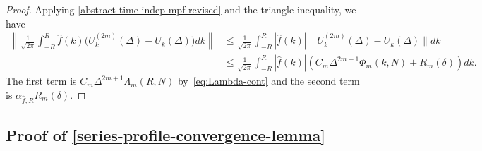 \documentclass[10pt,reqno]{article}
\numberwithin{equation}{section}
\theoremstyle{plain}
\theoremstyle{definition}
\begin{document}
\begin{proof}
Applying \cref{abstract-time-indep-mpf-revised} and the triangle inequality, we have
\begin{align}
\left\|\frac{1}{\sqrt{2 \pi}}  \int_{-R}^{R} \hat f(k)\big(U^{(2m)}_k(\Delta)-U_k(\Delta)\big)dk\right\|
&\le \frac{1}{\sqrt{2 \pi}} \int_{-R}^{R} |\hat f(k)| \|U^{(2m)}_k(\Delta)-U_k(\Delta) \| dk   \\
&\le \frac{1}{\sqrt{2 \pi}} \int_{-R}^{R} |\hat f(k)| (C_m\Delta^{2m+1}\Phi_m(k,N)+R_m(\delta) ) dk.
\end{align}
The first term is $ C_m \Delta^{2m+1}\Lambda_m(R,N)$ by~\cref{eq:Lambda-cont} and the second term is $\alpha_{\hat f, R} R_m(\delta)$.
\end{proof}

\subsection{Proof of \cref{series-profile-convergence-lemma}}\label{proof-of-series-profile-convergence-lemma}
\end{document}
